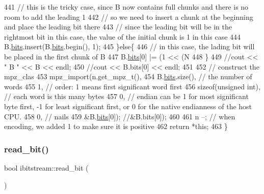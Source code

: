 \begin{DoxyCode}
441     \textcolor{comment}{// this is the tricky case, since B now contains full chunks and there is no room to add the leading 1}
442     \textcolor{comment}{// so we need to insert a chunk at the beginning and place the leading bit there}
443     \textcolor{comment}{// since the leading bit will be in the rightmost bit in this case, the value of the initial chunk is 1
       in this case}
444     B.\hyperlink{classbit__pipe_a86f38af1e9736b053728033490476b50}{bits}.insert(B.\hyperlink{classbit__pipe_a86f38af1e9736b053728033490476b50}{bits}.begin(), 1);
445   \}\textcolor{keywordflow}{else}\{
446     \textcolor{comment}{// in this case, the lading bit will be placed in the first chunk of B}
447     B.\hyperlink{classbit__pipe_a86f38af1e9736b053728033490476b50}{bits}[0] |= (1 << (N %
448   \}
449   \textcolor{comment}{//cout << " B " << B << endl;}
450   \textcolor{comment}{//cout << B.bits[0] << endl;}
451 
452   \textcolor{comment}{// construct the mpz\_clas}
453   mpz\_import(n.get\_mpz\_t(),
454              B.\hyperlink{classbit__pipe_a86f38af1e9736b053728033490476b50}{bits}.size(), \textcolor{comment}{// the number of words}
455              1, \textcolor{comment}{// order: 1 means first significant word first}
456              \textcolor{keyword}{sizeof}(\textcolor{keywordtype}{unsigned} int), \textcolor{comment}{// each word is this many bytes}
457              0, \textcolor{comment}{// endian can be 1 for most significant byte first, -1 for least significant first, or 0
       for the native endianness of the host CPU.}
458              0, \textcolor{comment}{// nails}
459              &B.\hyperlink{classbit__pipe_a86f38af1e9736b053728033490476b50}{bits}[0]); \textcolor{comment}{//&B.bits[0]);}
460 
461   n --; \textcolor{comment}{// when encoding, we added 1 to make sure it is positive}
462   \textcolor{keywordflow}{return} *\textcolor{keyword}{this};
463 \}
\end{DoxyCode}
\mbox{\label{classibitstream_a895239acf7179f6778388c39c97643e4}} 
\subsubsection{\texorpdfstring{read\+\_\+bit()}{read\_bit()}}
{\footnotesize\ttfamily bool ibitstream\+::read\+\_\+bit (\begin{DoxyParamCaption}{ }\end{DoxyParamCaption})}



